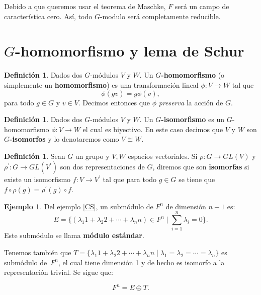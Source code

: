\documentclass[12pt]{book}
\theoremstyle{definition}
\newtheorem{definition}[theorem]{Definición}
\newtheorem{example}[theorem]{Ejemplo}
\newcounter{in}
\newcounter{ini}
\begin{document}
Debido a que queremos usar el teorema de Maschke, $F$ será un campo de
característica cero. Así, todo $G$-modulo será completamente
reducible.

\section{$G$-homomorfismo y lema de Schur} 
\label{schur}


\begin{definition}
  Dados dos $G$-módulos $V$ y $W$. Un $G$\textbf{-homomorfismo} (o simplemente
  un \textbf{homomorfismo}) es una transformación lineal $\phi:V\rightarrow
  W$ tal que
  \begin{equation*}
    \phi(gv)=g\phi(v),
  \end{equation*}
para todo $g\in G$ y $v\in V$. Decimos entonces que $\phi$ \emph{preserva} la acción
de $G$.
\end{definition}

\begin{definition}
  Dados dos $G$-módulos $V$ y $W$. Un $G$\textbf{-isomorfismo} es un
  $G$-homomorfismo $\phi:V\rightarrow W$ el cual es biyectivo. En
  este caso decimos que $V$ y $W$ son $G$\textbf{-isomorfos} y lo
  denotaremos como $V\cong W$.
\end{definition}

\begin{definition}
  Sean $G$ un grupo y $V,W$ espacios vectoriales. Si $\rho:G\rightarrow GL(V)$ y
  $\rho^{'}:G\rightarrow GL(V^{'})$ son dos representaciones de $G$,
  diremos que son \textbf{isomorfas} si existe un isomorfismo
  $f:V\rightarrow V^{'}$ tal que para todo $g\in G$ se tiene que
  $f\circ\rho(g)=\rho^{'}(g)\circ f$. 
\end{definition}

\begin{example}
  \label{sub-estandar}
  Del ejemplo \ref{CS}, un submódulo de
  $F^{n}$ de dimensión $n-1$ es:
  \begin{equation*}
    E=\Big\{(\lambda_{1}1+\lambda_{2}2+\cdots+\lambda_{n}n)\in F^{n}\mid\sum^{n}_{i=1}\lambda_{i}=0\Big\}.
  \end{equation*}
  Este submódulo se llama \textbf{módulo estándar}. 
  
  Tenemos también que $T=\{\lambda_{1}1+\lambda_{2}2+\cdots+\lambda_{n}n\mid
  \lambda_{1}=\lambda_{2}=\cdots=\lambda_{n}\}$ es submódulo
  de~$F^{n}$, el cual tiene dimensión 1 y de hecho
  es isomorfo a la representación trivial. Se sigue que:

  \begin{equation*}
    F^{n}=E\oplus T.
  \end{equation*}  
\end{example}
\end{document}
